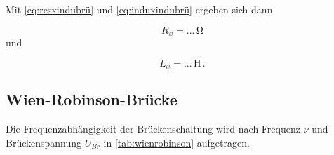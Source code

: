 Mit \eqref{eq:resxindubrü} und \eqref{eq:induxindubrü} ergeben sich dann

\begin{equation*}
  R_x = ... \,\unit{\ohm}
\end{equation*} und

\begin{equation*}
  L_x = ... \,\unit{\henry} \,.
\end{equation*}


\subsection{Wien-Robinson-Brücke}

Die Frequenzabhängigkeit der Brückenschaltung wird nach Frequenz $ν$ und Brückenspannung $U_{Br}$ in
\autoref{tab:wienrobinson} aufgetragen.

